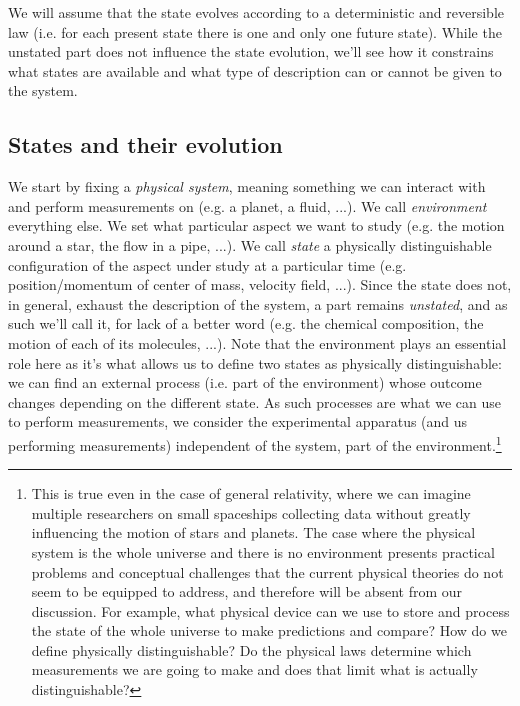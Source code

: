\documentclass[smallextended]{svjour3}
\numberwithin{equation}{section}
\begin{document}
We will assume that the state evolves according to a deterministic and reversible law (i.e. for each present state there is one and only one future state). While the unstated part does not influence the state evolution, we'll see how it constrains what states are available and what type of description can or cannot be given to the system.

\subsection{States and their evolution}

We start by fixing a \emph{physical system}, meaning something we can interact with and perform measurements on (e.g. a planet, a fluid, ...). We call \emph{environment} everything else. We set what particular aspect we want to study (e.g. the motion around a star, the flow in a pipe, ...). We call \emph{state} a physically distinguishable configuration of the aspect under study at a particular time (e.g. position/momentum of center of mass, velocity field, ...). Since the state does not, in general, exhaust the description of the system, a part remains \emph{unstated}, and as such we'll call it, for lack of a better word (e.g. the chemical composition, the motion of each of its molecules, ...). Note that the environment plays an essential role here as it's what allows us to define two states as physically distinguishable: we can find an external process (i.e. part of the environment) whose outcome changes depending on the different state. As such processes are what we can use to perform measurements, we consider the experimental apparatus (and us performing measurements) independent of the system, part of the environment.\footnote{This is true even in the case of general relativity, where we can imagine multiple researchers on small spaceships collecting data without greatly influencing the motion of stars and planets. The case where the physical system is the whole universe and there is no environment presents practical problems  and conceptual challenges that the current physical theories do not seem to be equipped to address, and therefore will be absent from our discussion. For example, what physical device can we use to store and process the state of the whole universe to make predictions and compare? How do we define physically distinguishable? Do the physical laws determine which measurements we are going to make and does that limit what is actually distinguishable?}
 
\end{document}

